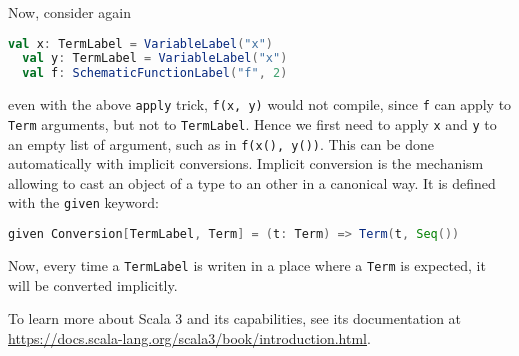 Now, consider again
\begin{lstlisting}[language=Scala]
  val x: TermLabel = VariableLabel("x")
  val y: TermLabel = VariableLabel("x")
  val f: SchematicFunctionLabel("f", 2)
\end{lstlisting}
even with the above \lstinline|apply| trick, \lstinline|f(x, y)| would not compile, since \lstinline|f| can apply to \lstinline|Term| arguments, but not to \lstinline|TermLabel|. Hence we first need to apply \lstinline|x| and \lstinline|y| to an empty list of argument, such as in \lstinline|f(x(), y())|.
This can be done automatically with implicit conversions. Implicit conversion is the mechanism allowing to cast an object of a type to an other in a canonical way. It is defined with the \lstinline|given| keyword:
%
\begin{lstlisting}[language=Scala]
  given Conversion[TermLabel, Term] = (t: Term) => Term(t, Seq())
\end{lstlisting}
%
Now, every time a \lstinline|TermLabel| is writen in a place where a \lstinline|Term| is expected, it will be converted implicitly.

To learn more about Scala 3 and its capabilities, see its documentation at {\footnotesize\url{https://docs.scala-lang.org/scala3/book/introduction.html}}. 

